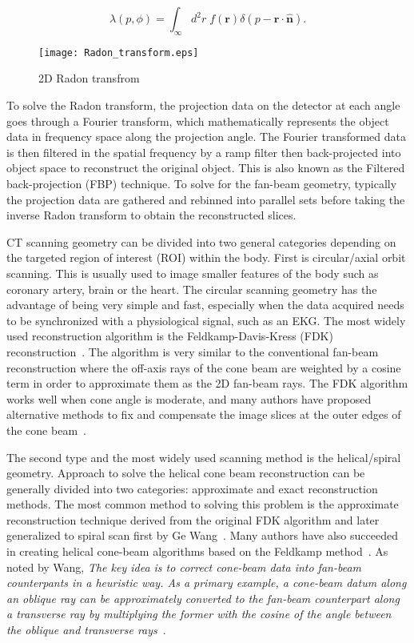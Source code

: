 \begin{equation}
\lambda(p, \phi) = \int_\infty d^2r \; f(\mathbf{r}) \delta(p- \mathbf{r} \cdot \mathbf{\hat{n}}).
\label{eq:radon}
\end{equation}

\begin{figure}[h]
\centering
\texttt{[image: Radon\_transform.eps]}
\caption{2D Radon transfrom }
\label{fig:RadonTransform}
\end{figure}

\noindent To solve the Radon transform, the projection data on the detector at each angle goes through a Fourier transform, which mathematically represents the object data in frequency space along the projection angle.  The Fourier transformed data is then filtered in the spatial frequency by a ramp filter then back-projected into object space to reconstruct the original object.  This is also known as the Filtered back-projection (FBP) technique.  To solve for the fan-beam geometry, typically the projection data are gathered and rebinned into parallel sets before taking the inverse Radon transform to obtain the reconstructed slices.

CT scanning geometry can be divided into two general categories depending on the targeted region of interest (ROI) within the body.  First is circular/axial orbit scanning.  This is usually used to image smaller features of the body such as coronary artery, brain or the heart.  The circular scanning geometry has the advantage of being very simple and fast, especially when the data acquired needs to be synchronized with a physiological signal, such as an EKG.  The most widely used reconstruction algorithm is the Feldkamp-Davis-Kress (FDK) reconstruction~\citep{Feldkamp1984}.  The algorithm is very similar to the conventional fan-beam reconstruction where the off-axis rays of the cone beam are weighted by a cosine term in order to approximate them as the 2D fan-beam rays.  The FDK algorithm works well when cone angle is moderate, and many authors have proposed alternative methods to fix and compensate the image slices at the outer edges of the cone beam~\citep{Katsevich2003, Chen2003, Hu1996}.

The second type and the most widely used scanning method is the helical/spiral geometry.  Approach to solve the helical cone beam reconstruction can be generally divided into two categories: approximate and exact reconstruction methods.  The most common method to solving this problem is the approximate reconstruction technique derived from the original FDK algorithm and later generalized to spiral scan first by Ge Wang~\citep{Wang1993}.  Many authors have also succeeded in creating helical cone-beam algorithms based on the Feldkamp method~\citep{Wang1992, Kudo1991, Yan1992, Smith1992, Noo1999, Kachelriess2000, Tang2004, Tang2006a, Tang2006b}.  As noted by Wang, \textit{The key idea is to correct cone-beam data into fan-beam counterpants in a heuristic way.  As a primary example, a cone-beam datum along an oblique ray can be approximately converted to the fan-beam counterpart along a transverse ray by multiplying the former with the cosine of the angle between the oblique and transverse rays}~\citep{Wang2007}.

